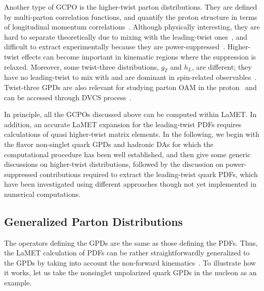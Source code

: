 \documentclass[aps,rmp,reprint,amsmath,amssymb,graphicx,longbibliography]{revtex4-1} %
\begin{document}
Another type of GCPO is the higher-twist parton distributions.
They are defined by multi-parton correlation functions, and quantify the proton structure
in terms of longitudinal momentum correlations~\cite{Jaffe:1982pm,Ellis:1982cd,Jaffe:1991ra}.
Although physically interesting, they are hard to
separate theoretically due to mixing with the
leading-twist ones~\cite{Mueller:1984vh,Ji:1994md}, and difficult to
extract experimentally because they are power-suppressed~\cite{Ji:1993ey}.
Higher-twist effects can become important in kinematic regions where the
suppression is relaxed. Moreover, some twist-three distributions,
$g_T$ and $h_L$, are different; they have no leading-twist to mix with and are dominant
in spin-related observables~\cite{Jaffe:1991ra}.
Twist-three GPDs are also relevant for studying parton OAM in the
proton~\cite{Hatta:2012cs,Ji:2012ba,Courtoy:2013oaa} and can be
accessed through DVCS process~\cite{Penttinen:2000dg,Kiptily:2002nx}.


In principle, all the GCPOs discussed above can be computed within LaMET.
%
In addition, an accurate LaMET expansion for the leading-twist PDFs requires
calculations of quasi higher-twist matrix elements.
In the following, we begin with the flavor non-singlet quark GPDs and hadronic DAs for which the computational procedure has been well established, and then give some generic discussions on higher-twist distributions, followed by the discussion on power-suppressed contributions required to extract the leading-twist quark PDFs, which have been investigated using different approaches though not yet implemented in numerical computations.


\subsection{Generalized Parton Distributions}
\label{sec:others-gpd}

The operators defining the GPDs are the same as those defining the PDFs. Thus, the LaMET calculation of PDFs can be rather straightforwardly generalized to the GPDs by taking into account the non-forward kinematics~\cite{Liu:2018tox}. To illustrate how it works, let us take the nonsinglet unpolarized quark GPDs in the nucleon as an example.
\end{document}
